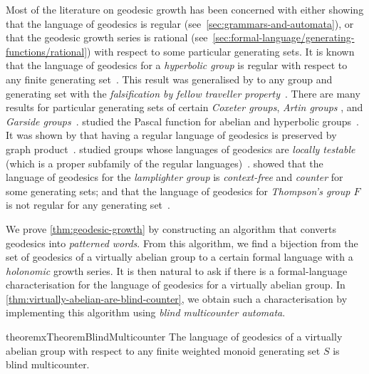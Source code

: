 Most of the literature on geodesic growth has been concerned with either showing that the language of geodesics is regular (see~\cref{sec:grammars-and-automata}), or that the geodesic growth series is rational (see~\cref{sec:formal-language/generating-functions/rational}) with respect to some particular generating sets.
It is known that the language of geodesics for a \emph{hyperbolic group} is regular with respect to any finite generating set~\cite[Theorem~3.4.5]{epstein1992}.
This result was generalised by \citeauthor{neumann1995} to any group and generating set with the \emph{falsification by fellow traveller property}~\cite[Proposition~4.2~on~p.~267]{neumann1995}.
There are many results for particular generating sets of certain \emph{Coxeter groups}, \emph{Artin groups} \cite{antolin2021,mairesse2006,kolpakov2020,ciobanu2016,antolin2013,holt2012,antolin2021,athreya2014}, and \emph{Garside groups}~\cite{sabalka2004,charney2004}.
 studied the Pascal function for abelian and hyperbolic groups~\cite{shapiro1997}.
It was shown by \citeauthor{loeffler2002} that having a regular language of geodesics is preserved by graph product~\cite{loeffler2002}.
 studied groups whose languages of geodesics are \emph{locally testable} (which is a proper subfamily of the regular languages)~\cite{hermiller2008}.
 showed that the language of geodesics for the \emph{lamplighter group} is \emph{context-free} and \emph{counter} for some generating sets; and that the language of geodesics for \emph{Thompson's group $F$} is not regular for any generating set~\cite{cleary2006}.

We prove \cref{thm:geodesic-growth} by constructing an algorithm that converts geodesics into \emph{patterned words}.
From this algorithm, we find a bijection from the set of geodesics of a virtually abelian group to a certain formal language with a \emph{holonomic} growth series.
It is then natural to ask if there is a formal-language characterisation for the language of geodesics for a virtually abelian group.
In \cref{thm:virtually-abelian-are-blind-counter}, we obtain such a characterisation by implementing this algorithm using \emph{blind multicounter automata}.

\begin{restatable*}{theoremx}{TheoremBlindMulticounter}\label{thm:virtually-abelian-are-blind-counter}
	The language of geodesics of a virtually abelian group with respect to any finite weighted monoid generating set $S$ is blind multicounter.
\end{restatable*}

